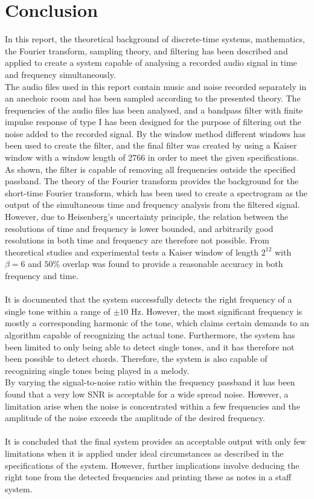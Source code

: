 \chapter{Conclusion}
In this report, the theoretical background of discrete-time systems, mathematics, the Fourier transform, sampling theory, and filtering has been described and applied to create a system capable of analysing a recorded audio signal in time and frequency simultaneously.
\\
The audio files used in this report contain music and noise recorded separately in an anechoic room and has been sampled according to the presented theory. The frequencies of the audio files has been analysed, and a bandpass filter with finite impulse response of type I has been designed for the purpose of filtering out the noise added to the recorded signal. By the window method different windows has been used to create the filter, and the final filter was created by using a Kaiser window with a window length of 2766 in order to meet the given specifications. As shown, the filter is capable of removing all frequencies outside the specified passband. The theory of the Fourier transform provides the background for the short-time Fourier transform, which has been used to create a spectrogram as the output of the simultaneous time and frequency analysis from the filtered signal. However, due to Heisenberg's uncertainty principle, the relation between the resolutions of time and frequency is lower bounded, and arbitrarily good resolutions in both time and frequency are therefore not possible. From theoretical studies and experimental tests a Kaiser window of length $2^{12}$ with $\beta = 6$ and $50\%$ overlap was found to provide a reasonable accuracy in both frequency and time.
\\ \\
It is documented that the system successfully detects the right frequency of a single tone within a range of $\pm 10$ Hz. However, the most significant frequency is mostly a corresponding harmonic of the tone, which claims certain demands to an algorithm capable of recognizing the actual tone. Furthermore, the system has been limited to only being able to detect single tones, and it has therefore not been possible to detect chords. Therefore, the system is also capable of recognizing single tones being played in a melody.
\\
By varying the signal-to-noise ratio within the frequency  passband it has been found that a very low SNR is acceptable for a wide spread noise. However, a limitation arise when the noise is concentrated within a few frequencies and the amplitude of the noise exceeds the amplitude of the desired frequency.
\\ \\
It is concluded that the final system provides an acceptable output with only few limitations when it is applied under ideal circumstances as described in the specifications of the system. However, further implications involve deducing the right tone from the detected frequencies and printing these as notes in a staff system.

 